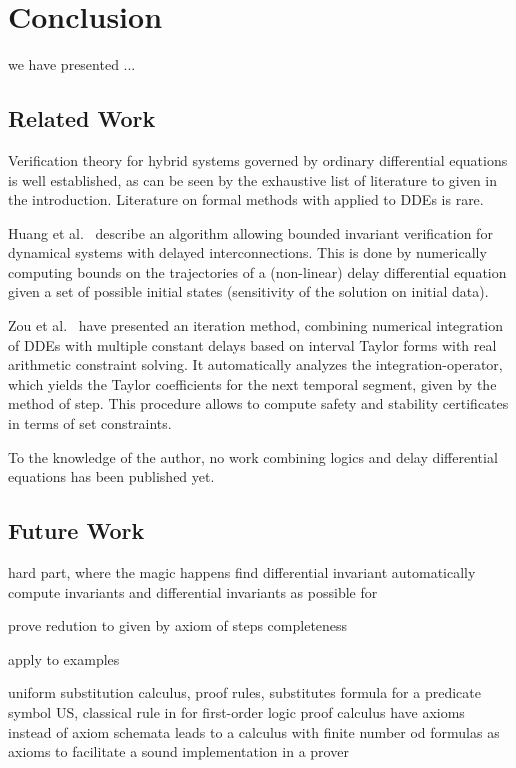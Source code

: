 \chapter{Conclusion}
    \label{ch:conclusion}

    we have presented ...

    \section{Related Work}
        Verification theory for hybrid systems governed by ordinary differential equations is well established, as can be seen by the exhaustive list of literature to \dL given in the introduction.
        Literature on formal methods with applied to DDEs is rare.
        
        Huang et al.~\cite{Huang16BoundedVerificationNNDS} describe an algorithm allowing bounded invariant verification for dynamical systems with delayed interconnections.
        This is done by numerically computing bounds on the trajectories of a (non-linear) delay differential equation given a set of possible initial states (sensitivity of the solution on initial data).
        
        Zou et al.~\cite{Zou15AutomaticVerifDDEs} have presented an iteration method, combining numerical integration of DDEs with multiple constant delays based on interval Taylor forms
        with real arithmetic constraint solving.
        It automatically analyzes the integration-operator, which yields the Taylor coefficients for the next temporal segment, given by the method of step.
        This procedure allows to compute safety and stability certificates in terms of set constraints.

        To the knowledge of the author, no work combining logics and delay differential equations has been published yet.

    \section{Future Work}
    	hard part, where the magic happens
        find differential invariant
        automatically compute invariants and differential invariants
        as possible for \dL

        prove redution to \dL given by axiom of steps
        completeness

        apply to examples

    	uniform substitution calculus, proof rules, substitutes formula for a predicate symbol
    	US, classical rule in for first-order logic proof calculus
    	have axioms instead of axiom schemata
    	leads to a calculus with finite number od \ddL formulas as axioms
    	to facilitate a sound implementation in a prover


